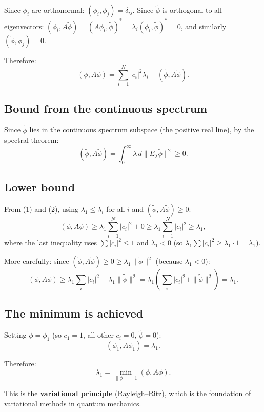 \documentclass[12pt]{article}
\begin{document}
Since $\phi_i$ are orthonormal: $(\phi_i, \phi_j) = \delta_{ij}$. Since $\tilde{\phi}$ is orthogonal to all eigenvectors: $(\phi_i, A\tilde{\phi}) = (A\phi_i, \tilde{\phi})^* = \lambda_i(\phi_i, \tilde{\phi})^* = 0$, and similarly $(\tilde{\phi}, \phi_j) = 0$.

Therefore:
\[
(\phi, A\phi) = \sum_{i=1}^{N}|c_i|^2\lambda_i + (\tilde{\phi}, A\tilde{\phi}). \tag{1}
\]

\subsection*{Bound from the continuous spectrum}

Since $\tilde{\phi}$ lies in the continuous spectrum subspace (the positive real line), by the spectral theorem:
\[
(\tilde{\phi}, A\tilde{\phi}) = \int_0^{\infty}\lambda\,d\|E_\lambda\tilde{\phi}\|^2 \geq 0. \tag{2}
\]

\subsection*{Lower bound}

From (1) and (2), using $\lambda_1 \leq \lambda_i$ for all $i$ and $(\tilde{\phi}, A\tilde{\phi}) \geq 0$:
\[
(\phi, A\phi) \geq \lambda_1\sum_{i=1}^{N}|c_i|^2 + 0 \geq \lambda_1\sum_{i=1}^{N}|c_i|^2 \geq \lambda_1,
\]
where the last inequality uses $\sum|c_i|^2 \leq 1$ and $\lambda_1 < 0$ (so $\lambda_1\sum|c_i|^2 \geq \lambda_1\cdot 1 = \lambda_1$).

More carefully: since $(\tilde{\phi}, A\tilde{\phi}) \geq 0 \geq \lambda_1\|\tilde{\phi}\|^2$ (because $\lambda_1 < 0$):
\[
(\phi, A\phi) \geq \lambda_1\sum_i|c_i|^2 + \lambda_1\|\tilde{\phi}\|^2 = \lambda_1(\sum_i|c_i|^2 + \|\tilde{\phi}\|^2) = \lambda_1.
\]

\subsection*{The minimum is achieved}

Setting $\phi = \phi_1$ (so $c_1 = 1$, all other $c_i = 0$, $\tilde{\phi} = 0$):
\[
(\phi_1, A\phi_1) = \lambda_1.
\]

Therefore:
\[
\boxed{\lambda_1 = \min_{\|\phi\|=1}(\phi, A\phi).}
\]

This is the \textbf{variational principle} (Rayleigh--Ritz), which is the foundation of variational methods in quantum mechanics.
\end{document}
